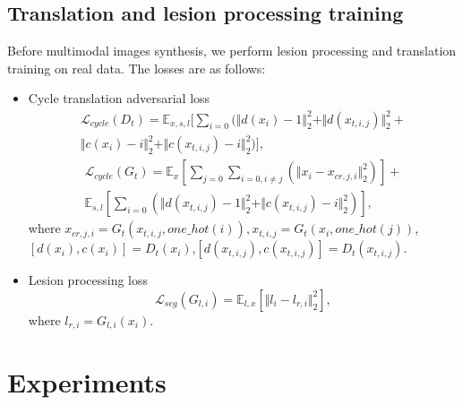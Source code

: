 \documentclass[runningheads]{llncs}
\begin{document}
	\subsection{Translation and lesion processing training}
	Before multimodal images synthesis, we perform lesion processing and translation training on real data. The losses are as follows:
	\begin{itemize}
		\item{Cycle translation adversarial loss}
		\begin{equation}
		\begin{split}
		\mathcal{L}_{cycle}(D_t)=\mathbb{E}_{x,s,l}[\sum\limits_{i=0}(\Vert{d(x_i)-1}\Vert_{2}^{2}+\Vert{d(x_{t,i,j})}\Vert_{2}^{2}+\\
		\Vert{c(x_i)-i}\Vert_{2}^{2}+\Vert{c(x_{t,i,j})-i}\Vert_{2}^{2})],
		\end{split}
		\end{equation}
		\begin{equation}
		\begin{split}
		\mathcal{L}_{cycle}(G_t)=\mathbb{E}_{x}[\sum\limits_{j=0}\sum\limits_{i=0,i\neq j}(\Vert{x_{i}-x_{cr,j,i}}\Vert_{2}^{2})]+\\\mathbb{E}_{s,l}[\sum\limits_{i=0}(\Vert{d(x_{t,i,j})-1}\Vert_{2}^{2}+\Vert{c(x_{t,i,j})-i}\Vert_{2}^{2})],
		\end{split}
		\end{equation}
		where $x_{cr,j,i}=G_t(x_{t,i,j},one\_hot(i)),x_{t,i,j}=G_t(x_{i},one\_hot(j))$,
		$[d(x_{i}),c(x_{i})]=D_t(x_{i})$,$[d(x_{t,i,j}),c(x_{t,i,j})]=D_t(x_{t,i,j})$.
		
		\item{Lesion processing loss}
		\begin{equation}
		\label{lesion segmentation loss}
		\mathcal{L}_{seg}(G_{l,i})=\mathbb{E}_{l,x}[\Vert{l_i-l_{r,i}}\Vert_{2}^{2}],
		\end{equation}
		where $l_{r,i}=G_{l,i}(x_{i})$.
	\end{itemize}
	
	\section{Experiments}
	
\end{document}

